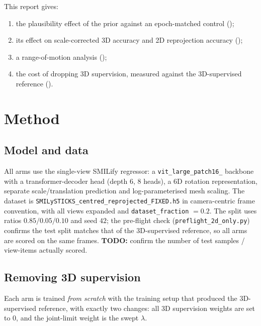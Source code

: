 \documentclass[11pt,a4paper]{article}
\newcommand{\lam}{\lambda}
\newcommand{\PH}[1]{#1}
\newcommand{\PH}[1]{\textcolor{red}{[#1]}}
\newcommand{\TODO}[1]{\PH{\textbf{TODO:} #1}}
\begin{document}
\noindent This report gives:
\begin{enumerate}[nosep,leftmargin=1.6em]
  \item the plausibility effect of the prior against an epoch-matched control
        ();
  \item its effect on scale-corrected 3D accuracy and 2D reprojection accuracy
        ();
  \item a range-of-motion analysis ();
  \item the cost of dropping 3D supervision, measured against the 3D-supervised
        reference ().
\end{enumerate}

\section{Method}
\label{sec:method}

\subsection{Model and data}

All arms use the single-view SMILify regressor: a
\texttt{vit\_large\_\allowbreak patch16\_} backbone with a transformer-decoder head
(depth $6$, $8$ heads), a 6D rotation representation, separate
scale/translation prediction and log-parameterised mesh scaling. The dataset is
\texttt{SMILySTICKS\_\allowbreak centred\_\allowbreak reprojected\_\allowbreak FIXED.h5} in camera-centric frame
convention, with all views expanded and \texttt{dataset\_fraction} $= 0.2$. The
split uses ratios $0.85/0.05/0.10$ and seed $42$; the pre-flight check
(\texttt{preflight\_2d\_only.py}) confirms the test split matches that of the
3D-supervised reference, so all arms are scored on the same frames.
\TODO{confirm the number of test samples / view-items actually scored.}

\subsection{Removing 3D supervision}

Each arm is trained \emph{from scratch} with the training setup that produced
the 3D-supervised reference, with exactly two changes: all 3D supervision
weights are set to $0$, and the joint-limit weight is the swept $\lam$.
\end{document}
